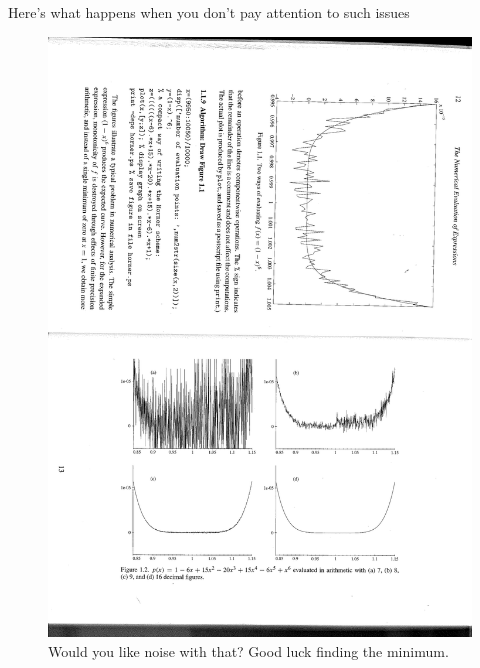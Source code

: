 \documentclass{beamer}
\begin{document}
\begin{frame}{Here's what happens when you don't pay attention to such issues}
\begin{figure}
\caption{Would you like noise with that? Good luck finding the minimum.}
\includegraphics[scale=0.3, angle=91]{polynomial_evaluation.pdf}
\end{figure}

\end{frame}
\end{document}
